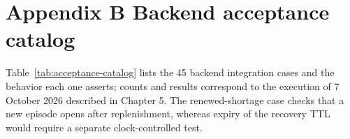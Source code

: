 \FloatBarrier

\section*{Appendix B Backend acceptance catalog}


Table~\ref{tab:acceptance-catalog} lists the 45 backend integration cases and the behavior each one asserts; counts and results correspond to the execution of 7 October 2026 described in Chapter 5. The renewed-shortage case checks that a new episode opens after replenishment, whereas expiry of the recovery TTL would require a separate clock-controlled test.


\begingroup\small{}\setlength{\tabcolsep}{3pt}\renewcommand{\arraystretch}{1.25}
